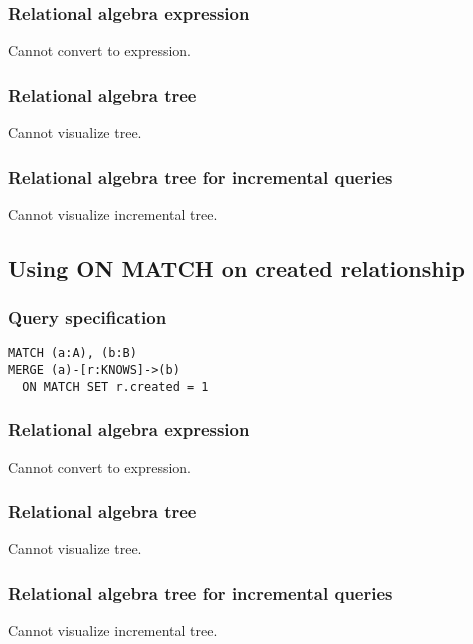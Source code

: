 \subsubsection*{Relational algebra expression}

Cannot convert to expression.

\subsubsection*{Relational algebra tree}

Cannot visualize tree.

\subsubsection*{Relational algebra tree for incremental queries}

Cannot visualize incremental tree.

\subsection{Using ON MATCH on created relationship}

\subsubsection*{Query specification}

\begin{lstlisting}
MATCH (a:A), (b:B)
MERGE (a)-[r:KNOWS]->(b)
  ON MATCH SET r.created = 1
\end{lstlisting}

\subsubsection*{Relational algebra expression}

Cannot convert to expression.

\subsubsection*{Relational algebra tree}

Cannot visualize tree.

\subsubsection*{Relational algebra tree for incremental queries}

Cannot visualize incremental tree.

